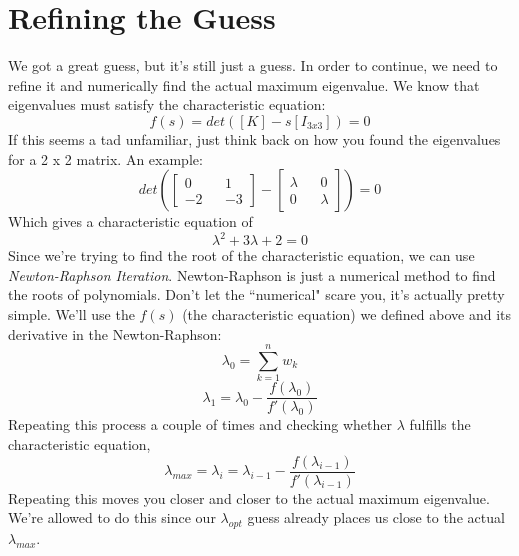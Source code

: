 \documentclass[a4paper,14pt]{extreport}
\begin{document}
\section{Refining the Guess}
We got a great guess, but it's still just a guess. In order to continue, we need to refine it and numerically find the actual maximum eigenvalue. We know that eigenvalues must satisfy the characteristic equation:
\[
f(s) = det([K]-s[I_{3x3}]) = 0
\]
If this seems a tad unfamiliar, just think back on how you found the eigenvalues for a 2 x 2 matrix. An example:
\[
det(
\begin{bmatrix}
0&&1\\-2&&-3
\end{bmatrix} - 
\begin{bmatrix}
\lambda&&0\\0&&\lambda
\end{bmatrix}) = 0
\]
Which gives a characteristic equation of
\[
\lambda^2+3\lambda+2=0
\]
Since we're trying to find the root of the characteristic equation, we can use \emph{Newton-Raphson Iteration}. Newton-Raphson is just a numerical method to find the roots of polynomials. Don't let the ``numerical" scare you, it's actually pretty simple. We'll use the $f(s)$  (the characteristic equation) we defined above and its derivative in the Newton-Raphson:
\[
\lambda_0 = \sum^n_{k=1} w_k
\]
\[
\lambda_1 = \lambda_0 - \dfrac{f(\lambda_0)}{f'(\lambda_0)}
\]
Repeating this process a couple of times and checking whether $\lambda$ fulfills the characteristic equation,
\[
\lambda_{max} = \lambda_i = \lambda_{i-1} - \dfrac{f(\lambda_{i-1})}{f'(\lambda_{i-1})}
\]
Repeating this moves you closer and closer to the actual maximum eigenvalue. We're allowed to do this since our $\lambda_{opt}$ guess already places us close to the actual $\lambda_{max}$.
\end{document}

